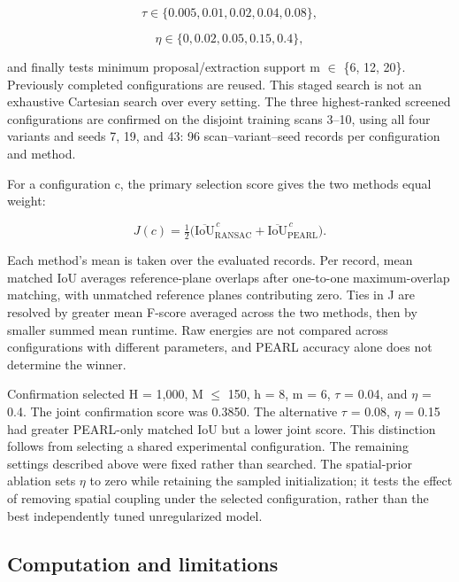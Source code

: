 \begin{equation}
\tau\in\{0.005,0.01,0.02,0.04,0.08\},
\label{eq:40}
\end{equation}

\begin{equation}
\eta\in\{0,0.02,0.05,0.15,0.4\},
\label{eq:41}
\end{equation}

and finally tests minimum proposal/extraction support m \(\in\) \{6, 12, 20\}. Previously completed configurations are reused. This staged search is not an exhaustive Cartesian search over every setting. The three highest-ranked screened configurations are confirmed on the disjoint training scans 3--10, using all four variants and seeds 7, 19, and 43: 96 scan--variant--seed records per configuration and method.

For a configuration c, the primary selection score gives the two methods equal weight:

\begin{equation}
J(c)=\tfrac12\bigl(\overline{\mathrm{IoU}}_{\mathrm{RANSAC}}^{\,c}+\overline{\mathrm{IoU}}_{\mathrm{PEARL}}^{\,c}\bigr).
\label{eq:42}
\end{equation}

Each method's mean is taken over the evaluated records. Per record, mean matched IoU averages reference-plane overlaps after one-to-one maximum-overlap matching, with unmatched reference planes contributing zero. Ties in J are resolved by greater mean F-score averaged across the two methods, then by smaller summed mean runtime. Raw energies are not compared across configurations with different parameters, and PEARL accuracy alone does not determine the winner.

Confirmation selected H = 1,000, M \(\leq\) 150, h = 8, m = 6, \(\tau\) = 0.04, and \(\eta\) = 0.4. The joint confirmation score was 0.3850. The alternative \(\tau\) = 0.08, \(\eta\) = 0.15 had greater PEARL-only matched IoU but a lower joint score. This distinction follows from selecting a shared experimental configuration. The remaining settings described above were fixed rather than searched. The spatial-prior ablation sets \(\eta\) to zero while retaining the sampled initialization; it tests the effect of removing spatial coupling under the selected configuration, rather than the best independently tuned unregularized model.

\subsection{Computation and limitations}\label{computation-and-limitations}


